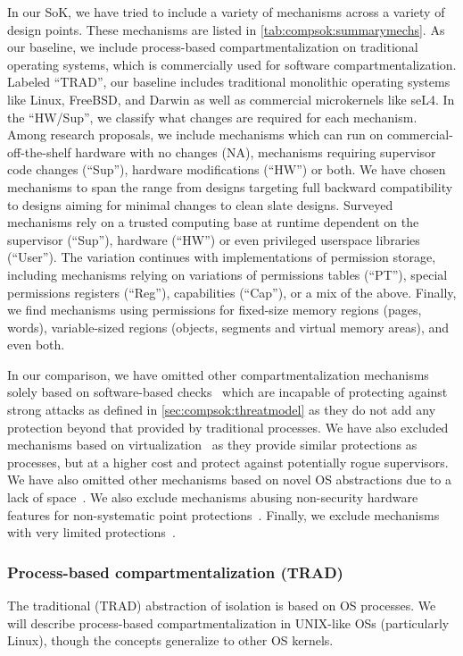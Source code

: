 In our SoK, we have tried to include a variety of mechanisms across a variety of
design points.
These mechanisms are listed in \autoref{tab:compsok:summarymechs}.
As our baseline, we include process-based compartmentalization on traditional
operating systems, which is commercially used for software compartmentalization.
Labeled ``TRAD'', our baseline includes traditional monolithic operating systems 
like Linux, FreeBSD, and Darwin as well as commercial microkernels like seL4.
In the ``HW/Sup'', we classify what changes are required for each mechanism.
Among research proposals, we include mechanisms which can run on 
commercial-off-the-shelf hardware with no changes (NA), 
mechanisms requiring supervisor code changes (``Sup''),
hardware modifications (``HW'') or both.
We have chosen mechanisms to span the range from designs targeting full 
backward compatibility to designs aiming for minimal changes to clean slate designs.
Surveyed mechanisms rely on a trusted computing base at runtime dependent on
the supervisor (``Sup''), hardware (``HW'') or even privileged userspace
libraries (``User'').
The variation continues with implementations of permission storage, including
mechanisms relying on variations of permissions tables (``PT''), special
permissions registers (``Reg''), capabilities (``Cap''), or a mix of the
above.
Finally, we find mechanisms using permissions for fixed-size memory regions 
(pages, words), variable-sized regions (objects, segments and virtual memory areas),
and even both.

In our comparison, we have omitted other compartmentalization mechanisms
solely based on software-based checks~\cite{WahbeLAG93} 
which are incapable of protecting against strong attacks as defined in 
\autoref{sec:compsok:threatmodel} as they
do not add any protection beyond that provided by traditional processes.
We have also excluded mechanisms based on 
virtualization~\cite{BelayBMTMK12, KoningCBGA17, LiuZCCX15, McCuneLQZDGP10, SharifLCL09}
as they provide similar protections as processes, 
but at a higher cost and protect against potentially rogue supervisors.
We have also omitted other mechanisms based on novel OS abstractions due to a
lack of space~\cite{HsuHEP16, DautenhahnKDCA15, ChenRSL16, BittauMHK08}.
We also exclude mechanisms abusing non-security hardware features for non-systematic
point protections~\cite{HedayatiGJCSSM19Hodor, GuanLLJW15}.
Finally, we exclude mechanisms with very limited protections~\cite{FrassettoJLS18}.

\subsubsection{Process-based compartmentalization (TRAD)}
The traditional (TRAD) abstraction of isolation is based on OS
processes.
We will describe process-based compartmentalization in UNIX-like OSs
(particularly Linux), 
though the concepts generalize to other OS kernels.

